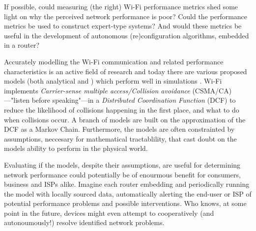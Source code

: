 If possible, could measuring (the right) Wi-Fi performance metrics shed some
light on why the perceived network performance is poor? Could the performance
metrics be used to construct expert-type systems? And would these metrics be
useful in the development of autonomous (re)configuration algorithms, embedded
in a router?




Accurately modelling the Wi-Fi communication and related performance
characteristics is an active field of research and today there are various
proposed models (both analytical and ) which perform well in simulations
\cite{bianchi}\cite{felemban}. Wi-Fi implements \emph{Carrier-sense multiple
access/Collision avoidance} (CSMA/CA)—"listen before speaking"—in a
\emph{Distributed Coordination Function} (DCF) to reduce the likelihood of
collisions happening in the first place, and what to do when collisions occur.
A branch of models are built on the approximation of the DCF as a Markov
Chain. Furthermore, the models are often constrainted by assumptions,
neccesary for mathematical tractablility, that cast doubt on the models
ability to perform in the physical world.

Evaluating if the models, despite their assumptions, are useful for
determining network performance could potentially be of enourmous benefit for
consumers, business and ISPs alike. Imagine each router embedding and
periodically running the model with locally sourced data, automatically
alerting the end-user or ISP of potential performance problems and possible
interventions. Who knows, at some point in the future, devices might even
attempt to cooperatively (and autonoumously!) resolve identified network
problems.


